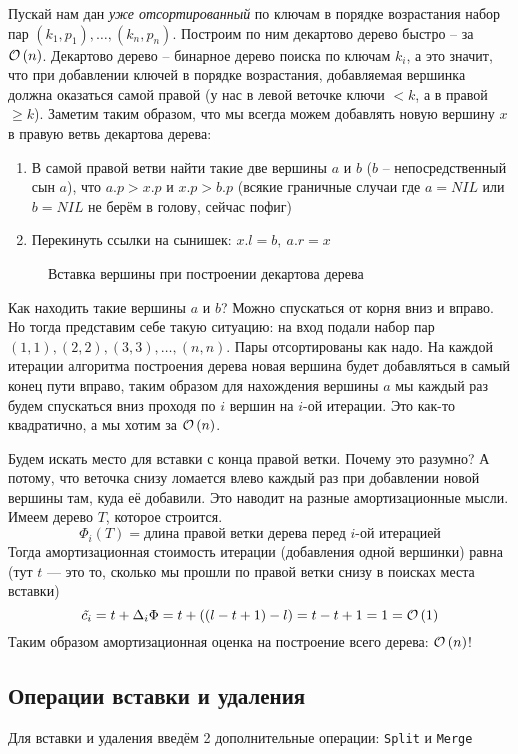 Пускай нам дан \emph{уже отсортированный} по ключам в порядке возрастания набор пар $(k_1, p_1), \ldots, (k_n, p_n)$. 
Построим по ним декартово дерево быстро -- за $\mathcal{O}\left(n\right)$. Декартово дерево -- бинарное дерево поиска по ключам $k_i$, а это значит, что при добавлении ключей в порядке возрастания, добавляемая вершинка должна оказаться самой правой (у нас в левой веточке ключи $< k$, а в правой $\geq k$). Заметим таким образом, что мы всегда можем добавлять новую вершину $x$ в правую ветвь декартова дерева:

\begin{enumerate}[label=\arabic*.]
\item В самой правой ветви найти такие две вершины $a$ и $b$ ($b$ -- непосредственный сын $a$), что $a.p > x.p$ и $x.p > b.p$ (всякие граничные случаи где $a = NIL$ или $b = NIL$ не берём в голову, сейчас пофиг)
\item Перекинуть ссылки на сынишек: $x.l = b,\ a.r = x$
\end{enumerate}

\begin{figure}[ht!]
\centering
\def\svgwidth{1.5in}

\caption{Вставка вершины при построении декартова дерева}
\end{figure}

Как находить такие вершины $a$ и $b$? Можно спускаться от корня вниз и вправо. Но тогда представим себе такую ситуацию: на вход подали набор пар $(1, 1), (2, 2), (3, 3), \ldots, (n, n)$. Пары отсортированы как надо. На каждой итерации алгоритма построения дерева новая вершина будет добавляться в самый конец пути вправо, таким образом для нахождения вершины $a$ мы каждый раз будем спускаться вниз проходя по $i$ вершин на $i$-ой итерации. Это как-то квадратично, а мы хотим за $\mathcal{O}\left(n\right)$.

Будем искать место для вставки с конца правой ветки. Почему это разумно? А потому, что веточка снизу ломается влево каждый раз при добавлении новой вершины там, куда её добавили. Это наводит на разные амортизационные мысли. Имеем дерево $T$, которое строится.
\[
	\Phi_i(T) = \text{длина правой ветки дерева перед $i$-ой итерацией}
\]
Тогда амортизационная стоимость итерации (добавления одной вершинки) равна (тут $t$ --- это то, сколько мы прошли по правой ветки снизу в поисках места вставки)
\[
	\tilde{c_i} = t + \Delta_i \Phi = t + ((l - t + 1) - l) = t - t + 1 = 1 = \mathcal{O}\left(1\right)
\]
Таким образом амортизационная оценка на построение всего дерева: $\mathcal{O}\left(n\right)$!
\subsection{Операции вставки и удаления}
Для вставки и удаления введём 2 дополнительные операции: \texttt{Split} и \texttt{Merge}

